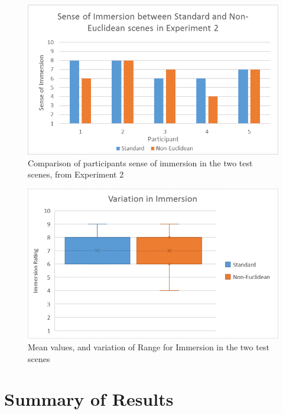 			\begin{figure}[H]
				\includegraphics[width=1\textwidth]{Images/Compare_Immersion_Exp_2}
				\centering
				\caption{Comparison of participants sense of immersion in the two test scenes, from Experiment 2}
				\label{exp:fig:compare_immersion_exp2}
			\end{figure}

			\begin{figure}[H]
				\includegraphics[width=1\textwidth]{Images/Compare_Immersion_Variation}
				\centering
				\caption{Mean values, and variation of Range for Immersion in the two test scenes}
				\label{exp:fig:compare_immersion_variation}
			\end{figure}

	\section[Summary]{Summary of Results}
	\label{exp:summary}

